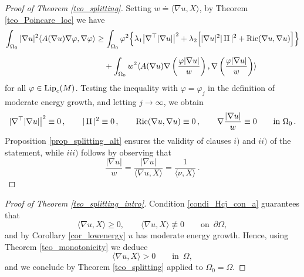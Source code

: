 \documentclass[10 pt,a4paper]{article}
\theoremstyle{definition}
\newtheorem{remark}[definition]{Remark}
\begin{document}
\begin{proof}[Proof of Theorem \ref{teo_splitting}]
Setting $w \doteq \langle \nabla u, X \rangle$, by Theorem \ref{teo_Poincare_loc} we have
	\begin{align*}
		\int_{\Omega_0} |\nabla u|^2 \langle A(\nabla u) \nabla \varphi, \nabla \varphi \rangle & \geq \int_{\Omega_0} \varphi^2 \Big\{\lambda_1 \big|\nabla^\top  |\nabla u|\big|^2 +\lambda_2\Big[|\nabla u|^2|\operatorname{II}|^2 +\mathrm{Ric}(\nabla u, \nabla u)\Big]\Big\} \\[0.2cm]
		& \phantom{=\;} + \int_{\Omega_0} w^2 \langle A(\nabla u) \nabla \left(\frac{\varphi|\nabla u|}{w}\right), \nabla \left(\frac{\varphi|\nabla u|}{w}\right) \rangle
	\end{align*}
	for all $\varphi\in\mathrm{Lip}_c(M)$. 
	Testing the inequality with $\varphi = \varphi_j$ in the definition of moderate energy growth, and letting $j \to \infty$, we obtain
	\[
		|\nabla^\top  |\nabla u|\big|^2 \equiv 0 \, , \qquad |\operatorname{II}|^2 \equiv 0 \, , \qquad \mathrm{Ric}(\nabla u, \nabla u) \equiv 0 \, , \qquad \nabla \frac{|\nabla u|}{w} \equiv 0 \qquad \text{in } \Omega_0 \, .
	\]
	Proposition \ref{prop_splitting_alt} ensures the validity of clauses $i)$ and $ii)$ of the statement, %
	while $iii)$ follows by observing that
	\[
		\frac{|\nabla u|}{w} = \frac{|\nabla u|}{\langle\nabla u,X\rangle} = \frac{1}{\langle \nu,X\rangle} \, .
	\]
\end{proof}

\begin{proof}[Proof of Theorem \ref{teo_splitting_intro}]
	Condition \eqref{condi_Hcj_con_a} guarantees that 
	\[
	\langle \nabla u, X \rangle \ge 0, \qquad \langle \nabla u, X \rangle \not\equiv 0 \qquad \text{on } \, \partial \Omega,
	\]
	and by Corollary \ref{cor_lowenergy} $u$ has moderate energy growth. Hence, using Theorem \ref{teo_monotonicity} we deduce 
	\[
	\langle \nabla u, X \rangle > 0 \qquad \text{in } \, \Omega,
	\]
	and we conclude by Theorem \ref{teo_splitting} applied to $\Omega_0 = \Omega$.
\end{proof}

\end{document}
